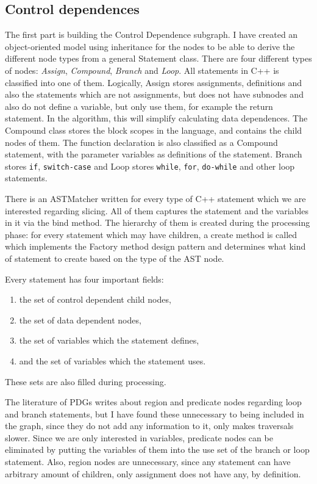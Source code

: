\documentclass[oneside,12pt,a4paper]{book}
\begin{document}
\subsection{Control dependences}

The first part is building the Control Dependence subgraph. I have created an object-oriented model using inheritance for the nodes to be able to derive the different node types from a general Statement class. There are four different types of nodes: \textit{Assign}, \textit{Compound}, \textit{Branch} and \textit{Loop}. All statements in C++ is classified into one of them. Logically, Assign stores assignments, definitions and also the statements which are not assignments, but does not have subnodes and also do not define a variable, but only use them, for example the return statement. In the algorithm, this will simplify calculating data dependences. The Compound class stores the block scopes in the language, and contains the child nodes of them. The function declaration is also classified as a Compound statement, with the parameter variables as definitions of the statement. Branch stores \texttt{if}, \texttt{switch-case} and Loop stores \texttt{while}, \texttt{for}, \texttt{do-while} and other loop statements.

There is an ASTMatcher written for every type of C++ statement which we are interested regarding slicing. All of them captures the statement and the variables in it via the bind method. The hierarchy of them is created during the processing phase: for every statement which may have children, a create method is called which implements the Factory method design pattern and determines what kind of statement to create based on the type of the AST node. 

Every statement has four important fields:
\begin{enumerate}
\item the set of control dependent child nodes,
\item the set of data dependent nodes,
\item the set of variables which the statement defines,
\item and the set of variables which the statement uses.
\end{enumerate}

These sets are also filled during processing.

The literature of PDGs writes about region and predicate nodes regarding loop and branch statements, but I have found these unnecessary to being included in the graph, since they do not add any information to it, only makes traversals slower. Since we are only interested in variables, predicate nodes can be eliminated by putting the variables of them into the use set of the branch or loop statement. Also, region nodes are unnecessary, since any statement can have arbitrary amount of children, only assignment does not have any, by definition.
\end{document}
